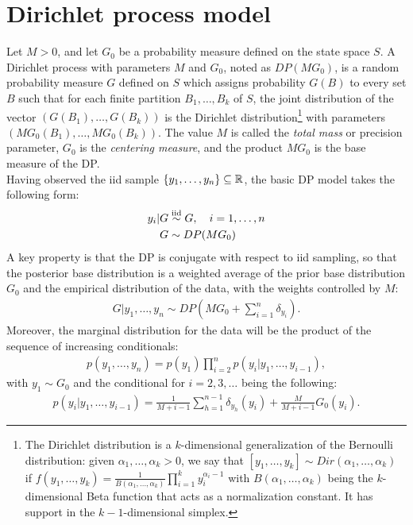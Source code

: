 \section{Dirichlet process model}
Let $M>0$, and let $G_0$ be a probability measure defined on the state space $S$.
A Dirichlet process with parameters $M$ and $G_0$, noted as $DP(M G_0)$, is a random probability measure $G$ defined on $S$ which assigns probability $G(B)$ to every set $B$ such that for each finite partition ${B_1,\dots,B_k}$ of $S$, the joint distribution of the  vector $(G(B_1),\dots,G(B_k))$ is the Dirichlet distribution\footnote{
The Dirichlet distribution is a $k$-dimensional generalization of the Bernoulli distribution: given $\alpha_1,\dots,\alpha_k > 0$, we say that $[y_1,\dots,y_k] \sim Dir(\alpha_1, \dots, \alpha_k)$ if $f(y_1,\dots,y_k) = \frac{1}{B(\alpha_1, \dots, \alpha_k)} \prod_{i=1}^k y_i^{\alpha_i-1}$ with $B(\alpha_1, \dots, \alpha_k)$ being the $k$-dimensional Beta function that acts as a normalization constant.
It has support in the $k-1$-dimensional simplex.
}
with parameters $(MG_0(B_1),\dots,MG_0(B_k))$.
The value $M$ is called the \emph{total mass} or precision parameter, $G_0$ is the \emph{centering measure}, and the product $MG_0$ is the base measure of the DP. \\
Having observed the iid sample $\{y_1,\dots,y_n\} \subseteq \mathbb R$, the basic DP model takes the following form:
\begin{equation}\label{dpm}
	\begin{aligned}
	y_i | G &\stackrel{\text{iid}}{\sim} G, \quad i=1,\dots,n \\
	G &\sim DP(MG_0)
	\end{aligned}
\end{equation}
A key property is that the DP is conjugate with respect to iid sampling, so that the posterior base distribution is a weighted average of the prior base distribution $G_0$ and the empirical distribution of the data, with the weights controlled by $M$:
\begin{align}\label{dp-posterior}
	G | y_1,\dots,y_n \sim DP\left(M G_0 + \sum_{i=1}^n \delta_{y_i}\right).
\end{align}
Moreover, the marginal distribution for the data will be the product of the sequence of increasing conditionals:
\begin{align*}
	p(y_1,\dots,y_n)= p(y_1)\prod\limits_{i=2}^{n} p(y_i|y_1,\dots,y_{i-1}),
\end{align*}
with $y_1 \sim G_0$ and the conditional for $i=2,3,\dots$ being the following:
\begin{equation}
	\begin{aligned}
		p(y_i|y_1,\dots,y_{i-1}) =
		\frac{1}{M+i-1}\sum_{h=1}^{n-1} \delta_{y_h}(y_i) + \frac{M}{M+i-1} G_0(y_i).
	\end{aligned}
\end{equation}
